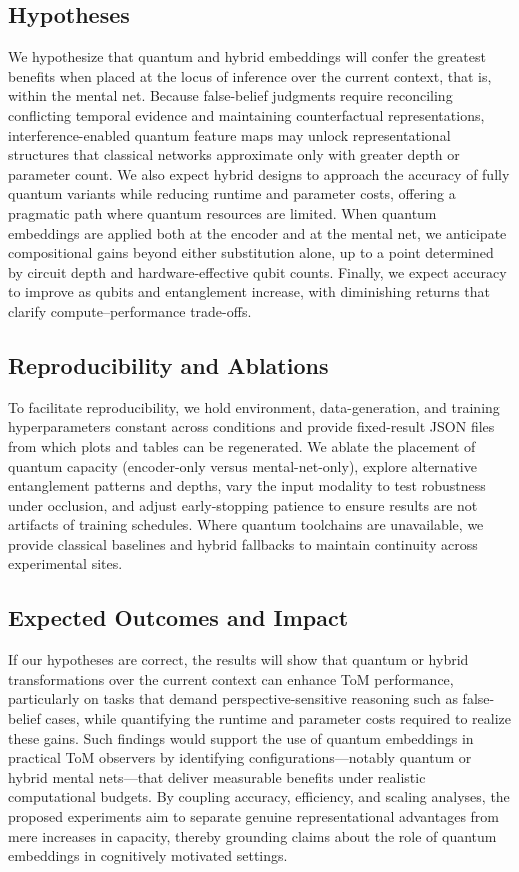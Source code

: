\subsection{Hypotheses}
We hypothesize that quantum and hybrid embeddings will confer the greatest benefits when placed at the locus of inference over the current context, that is, within the mental net. Because false-belief judgments require reconciling conflicting temporal evidence and maintaining counterfactual representations, interference-enabled quantum feature maps may unlock representational structures that classical networks approximate only with greater depth or parameter count. We also expect hybrid designs to approach the accuracy of fully quantum variants while reducing runtime and parameter costs, offering a pragmatic path where quantum resources are limited. When quantum embeddings are applied both at the encoder and at the mental net, we anticipate compositional gains beyond either substitution alone, up to a point determined by circuit depth and hardware-effective qubit counts. Finally, we expect accuracy to improve as qubits and entanglement increase, with diminishing returns that clarify compute–performance trade-offs.

\subsection{Reproducibility and Ablations}
To facilitate reproducibility, we hold environment, data-generation, and training hyperparameters constant across conditions and provide fixed-result JSON files from which plots and tables can be regenerated. We ablate the placement of quantum capacity (encoder-only versus mental-net-only), explore alternative entanglement patterns and depths, vary the input modality to test robustness under occlusion, and adjust early-stopping patience to ensure results are not artifacts of training schedules. Where quantum toolchains are unavailable, we provide classical baselines and hybrid fallbacks to maintain continuity across experimental sites.

\subsection{Expected Outcomes and Impact}
If our hypotheses are correct, the results will show that quantum or hybrid transformations over the current context can enhance ToM performance, particularly on tasks that demand perspective-sensitive reasoning such as false-belief cases, while quantifying the runtime and parameter costs required to realize these gains. Such findings would support the use of quantum embeddings in practical ToM observers by identifying configurations---notably quantum or hybrid mental nets---that deliver measurable benefits under realistic computational budgets. By coupling accuracy, efficiency, and scaling analyses, the proposed experiments aim to separate genuine representational advantages from mere increases in capacity, thereby grounding claims about the role of quantum embeddings in cognitively motivated settings.
